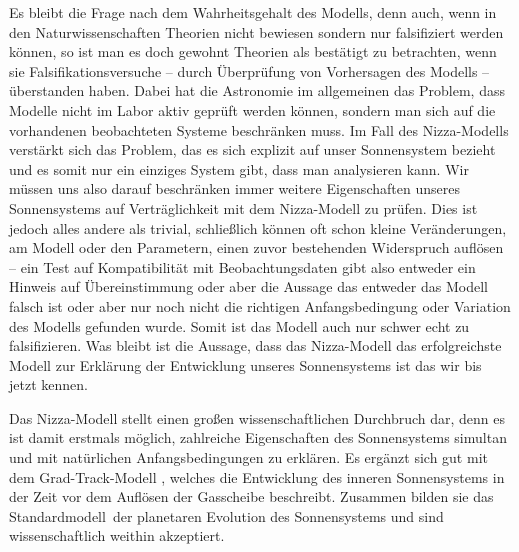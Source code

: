 \documentclass[12pt,a4paper,twoside,open=right,bibliography=totoc]{scrbook}
\renewcommand{\cite}{ \citep}
\begin{document}
Es bleibt die Frage nach dem Wahrheitsgehalt des Modells, denn auch, wenn in den Naturwissenschaften Theorien nicht bewiesen sondern nur falsifiziert werden können, so ist man es doch gewohnt Theorien als bestätigt zu betrachten, wenn sie Falsifikationsversuche -- durch Überprüfung von Vorhersagen des Modells -- überstanden haben.
Dabei hat die Astronomie im allgemeinen das Problem, dass Modelle nicht im Labor aktiv geprüft werden können, sondern man sich auf die vorhandenen beobachteten Systeme beschränken muss.
Im Fall des Nizza-Modells verstärkt sich das Problem, das es sich explizit auf unser Sonnensystem bezieht und es somit nur ein einziges System gibt, dass man analysieren kann.
Wir müssen uns also darauf beschränken immer weitere Eigenschaften unseres Sonnensystems auf Verträglichkeit mit dem Nizza-Modell zu prüfen.
Dies ist jedoch alles andere als trivial, schließlich können oft schon kleine Veränderungen, am Modell oder den Parametern, einen zuvor bestehenden Widerspruch auflösen -- ein Test auf Kompatibilität mit Beobachtungsdaten gibt also entweder ein Hinweis auf Übereinstimmung oder aber die Aussage das entweder das Modell falsch ist oder aber nur noch nicht die richtigen Anfangsbedingung oder Variation des Modells gefunden wurde.
Somit ist das Modell auch nur schwer echt zu falsifizieren. Was bleibt ist die Aussage, dass das Nizza-Modell das erfolgreichste Modell zur Erklärung der Entwicklung unseres Sonnensystems ist das wir bis jetzt kennen.

Das Nizza-Modell stellt einen großen wissenschaftlichen Durchbruch dar, denn es ist damit erstmals möglich, zahlreiche Eigenschaften des Sonnensystems simultan und mit natürlichen Anfangsbedingungen zu erklären. Es ergänzt sich gut mit dem Grad-Track-Modell\cite{Walsh2011}, welches die Entwicklung des inneren Sonnensystems in der Zeit vor dem Auflösen der Gasscheibe beschreibt. Zusammen bilden sie das \glqq Standardmodell\grqq\ der planetaren Evolution des Sonnensystems und sind wissenschaftlich weithin akzeptiert.



\newpage

\end{document}
